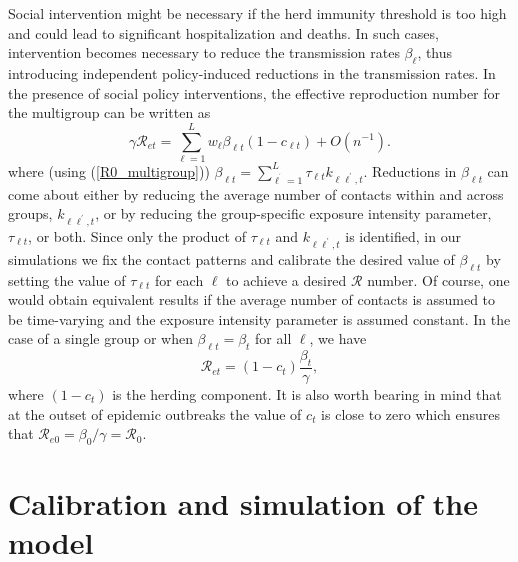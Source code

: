 \documentclass[12pt]{article}
\begin{document}
Social intervention might be necessary if the herd immunity threshold is too
high and could lead to significant hospitalization and deaths. In such cases,
intervention becomes necessary to reduce the transmission rates $\beta_{\ell}%
$, thus introducing independent policy-induced reductions in the transmission
rates. In the presence of social policy interventions, the effective
reproduction number for the multigroup can be written as%
\begin{equation}
\gamma\mathcal{R}_{et}=\sum_{\ell=1}^{L}w_{\ell}\beta_{\ell t}\left(
1-c_{\ell t}\right)  +O\left(  n^{-1}\right)  .\label{Ret_pll'}%
\end{equation}
where (using (\ref{R0_multigroup})) $\beta_{\ell t}=\sum_{\ell^{^{\prime}}%
=1}^{L}\tau_{\ell t}k_{\ell\ell^{\prime},t}.$ Reductions in $\beta_{\ell t}$
can come about either by reducing the average number of contacts within and
across groups, $k_{\ell\ell^{\prime},t}$, or by reducing the group-specific
exposure intensity parameter, $\tau_{\ell t}$, or both. Since only the product
of $\tau_{\ell t}$ and $k_{\ell\ell^{\prime},t}$ is identified, in our
simulations we fix the contact patterns and calibrate the desired value of
$\beta_{\ell t}$ by setting the value of $\tau_{\ell t}$ for each $\ell$ to
achieve a desired $\mathcal{R}$ number. Of course, one would obtain equivalent
results if the average number of contacts is assumed to be time-varying and
the exposure intensity parameter is assumed constant. In the case of a single
group or when $\beta_{\ell t}=\beta_{t}$ for all $\ell$, we have
\begin{equation}
\mathcal{R}_{et}=(1-c_{t})\frac{\beta_{t}}{\gamma},\label{Ret_one_group}%
\end{equation}
where $(1-c_{t})$ is the herding component. It is also worth bearing in mind
that at the outset of epidemic outbreaks the value of $c_{t}$ is close to zero
which ensures that $\mathcal{R}_{e0}=\beta_{0}/\gamma=\mathcal{R}_{0}$.

\section{Calibration and simulation of the model\label{Sec: properties}}
\end{document}
